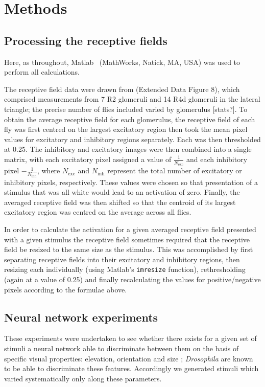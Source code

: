 \documentclass[a4paper,12pt]{article}
\begin{document}
\doublespacing


\section{Methods}
\subsection{Processing the receptive fields}
Here, as throughout, Matlab \textregistered\ (MathWorks, Natick, MA, USA) was used to perform all calculations.

The receptive field data were drawn from  (Extended Data Figure 8), which comprised measurements from 7 R2 glomeruli and 14 R4d glomeruli in the lateral triangle; the precise number of flies included varied by glomerulus [stats?].
To obtain the average receptive field for each glomerulus, the receptive field of each fly was first centred on the largest excitatory region then took the mean pixel values for excitatory and inhibitory regions separately.
Each was then thresholded at 0.25.
The inhibitory and excitatory images were then combined into a single matrix, with each excitatory pixel assigned a value of $\frac{1}{N_{\mathrm{exc}}}$ and each inhibitory pixel $-\frac{1}{N_{\mathrm{inh}}}$, where $N_{\mathrm{exc}}$ and $N_{\mathrm{inh}}$ represent the total number of excitatory or inhibitory pixels, respectively.
These values were chosen so that presentation of a stimulus that was all white would lead to an activation of zero.
Finally, the averaged receptive field was then shifted so that the centroid of its largest excitatory region was centred on the average across all flies.

In order to calculate the activation for a given averaged receptive field presented with a given stimulus the receptive field sometimes required that the receptive field be resized to the same size as the stimulus. This was accomplished by first separating receptive fields into their excitatory and inhibitory regions, then resizing each individually (using Matlab's \texttt{imresize} function), rethresholding (again at a value of 0.25) and finally recalculating the values for positive/negative pixels according to the formulae above.

\subsection{Neural network experiments}
These experiments were undertaken to see whether there exists for a given set of stimuli a neural network able to discriminate between them on the basis of specific visual properties: elevation, orientation and size \cite{wystrach2014insect}; \textit{Drosophila} are known to be able to discriminate these features.
Accordingly we generated stimuli which varied systematically only along these parameters.
\end{document}
